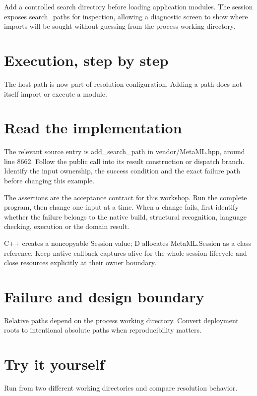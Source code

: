 \clearpage
{}
Add a controlled search directory before loading application modules. The session exposes search\_paths for inspection, allowing a diagnostic screen to show where imports will be sought without guessing from the process working directory.


\section*{Execution, step by step}
The host path is now part of resolution configuration. Adding a path does not itself import or execute a module.

\section*{Read the implementation}
The relevant source entry is add\_search\_path in vendor/MetaML.hpp, around line 8662. Follow the public call into its result construction or dispatch branch. Identify the input ownership, the success condition and the exact failure path before changing this example.

The assertions are the acceptance contract for this workshop. Run the complete program, then change one input at a time. When a change fails, first identify whether the failure belongs to the native build, structural recognition, language checking, execution or the domain result.

\clearpage
{}
C++ creates a noncopyable Session value; D allocates MetaML.Session as a class reference. Keep native callback captures alive for the whole session lifecycle and close resources explicitly at their owner boundary.


\section*{Failure and design boundary}
Relative paths depend on the process working directory. Convert deployment roots to intentional absolute paths when reproducibility matters.

\section*{Try it yourself}
Run from two different working directories and compare resolution behavior.

